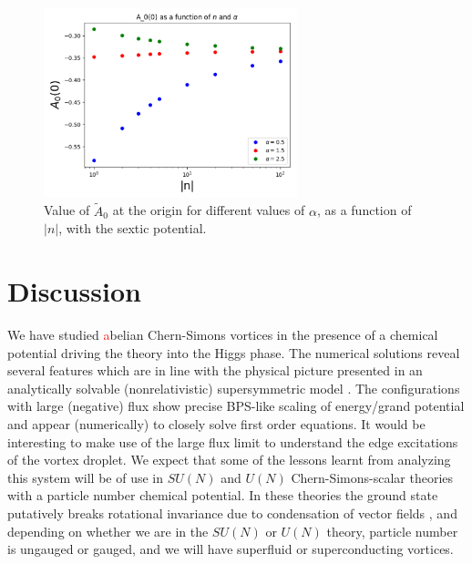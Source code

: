 \begin{figure}[H]
\begin{center}
    \includegraphics[width=2.9in]{Chapter_2_Folder_1912.11321/figures/sixth_order_A0.pdf}     \caption[This figure shows value of $\tilde A_0$ at the origin for different values of $\alpha$, as a function of $|n|$,  
 with the sextic potential.]{{ \small Value of $\tilde A_0$ at the origin for different values of $\alpha$, as a function of $|n|$,  
 with the sextic potential.}} \label{A0sextic}
    \end{center}
\end{figure}
\section{Discussion}
We have studied \textcolor{red}{a}belian Chern-Simons vortices in the presence of a chemical potential driving the theory into the Higgs phase. The numerical solutions reveal several features which are in line with the physical picture presented in an analytically solvable (nonrelativistic) supersymmetric model \cite{Tong:2015xaa, Tong:2003vy}.  The configurations with large (negative) flux show precise BPS-like scaling of energy/grand potential and appear (numerically) to closely solve first order equations.
It would be interesting to make use of the large flux limit to understand the edge excitations of the vortex droplet. We expect that some of the lessons learnt from analyzing this system will be of use in $SU(N)$ and $U(N)$ Chern-Simons-scalar theories with a particle number chemical potential. In these theories the ground state putatively breaks rotational invariance due to condensation of vector fields \cite{Kumar:2018nkf}, and depending on whether we are in the $SU(N)$ or $U(N)$ theory, particle number is ungauged or gauged,  and we will have superfluid or superconducting vortices. 




